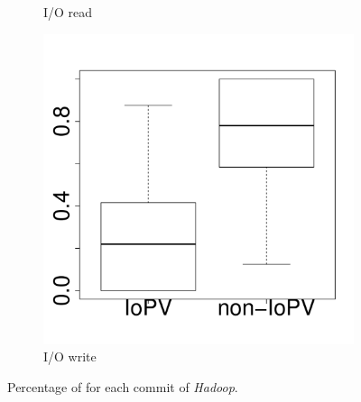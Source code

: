 \begin{figure}[t]
\begin{subfigure}{0.19\textwidth}
                \caption{I/O read}
        \end{subfigure}
        \begin{subfigure}{0.19\textwidth}
                \includegraphics[width=\linewidth]{Figures/iowrite-hadoop-boxplot.pdf}
                \caption{I/O write}
        \end{subfigure}
        
	\caption{Percentage of \inconsistent for each commit of \emph{Hadoop}. }
	\label{fig:iopv_per_commit_hadoop}
\end{figure}


